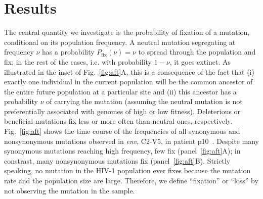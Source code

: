 \documentclass[10pt]{article}
\newcommand{\pfix}{P_{\mathrm{fix}}}
\newcommand{\FIG}[1]{Fig.~\ref{fig:#1}}
\newcommand{\env}{\textit{env}}
\newcommand{\shankaregion}{C2-V5}
\begin{document}
\section*{Results}
The central quantity we investigate is the probability of fixation of a
mutation, conditional on its population frequency. A neutral mutation
segregating at frequency $\nu$ has a probability $\pfix(\nu) = \nu$ to
spread through the population and fix; in the rest of the cases, i.e. with
probability $1-\nu$, it goes extinct. As illustrated in the inset of
\FIG{aft}A, this is a  consequence of the fact that (i) exactly one
individual in the current population will be the common ancestor of the entire
future population at a particular site and (ii) this ancestor has a probability
$\nu$ of carrying the mutation (assuming the neutral mutation is not
preferentially associated with genomes of high or low fitness). Deleterious or
beneficial mutations fix less or more often than neutral ones, respectively.
\FIG{aft} shows the time course of the frequencies of all synonymous and
nonsynonymous mutations observed in \env, \shankaregion, in patient
p10~\cite{shankarappa_consistent_1999}. Despite many synonymous
mutations reaching high frequency, few fix (panel~\ref{fig:aft}A); in
constrast, many nonsynonymous mutations fix (panel~\ref{fig:aft}B).
Strictly speaking, no mutation in the HIV-1 population ever fixes because the 
mutation rate and the population size are large. Therefore, we define ``fixation'' or ``loss''
by not observing the mutation in the sample.

\end{document}
